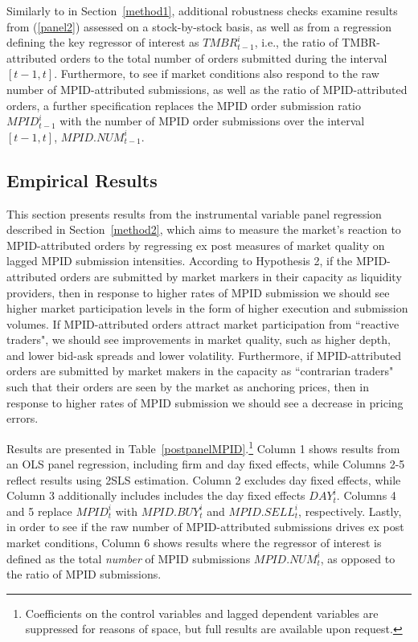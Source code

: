 \documentclass{article}
\begin{document}
Similarly to in Section~\ref{method1}, additional robustness checks examine results from (\ref{panel2}) assessed on a stock-by-stock basis, as well as from a regression defining the key regressor of interest as $TMBR_{t-1}^i$, i.e., the ratio of TMBR-attributed orders to the total number of orders submitted during the interval $[t-1,t]$. Furthermore, to see if market conditions also respond to the raw number of MPID-attributed submissions, as well as the ratio of MPID-attributed orders, a further specification replaces the MPID order submission ratio $MPID_{t-1}^i$ with the number of MPID order submissions over the interval $[t-1,t]$, $MPID.NUM_{t-1}^i$.

\subsection{Empirical Results}

This section presents results from the instrumental variable panel regression described in Section~\ref{method2}, which aims to measure the market's reaction to MPID-attributed orders by regressing ex post measures of market quality on lagged MPID submission intensities. According to Hypothesis 2, if the MPID-attributed orders are submitted by market markers in their capacity as liquidity providers, then in response to higher rates of MPID submission we should see higher market participation levels in the form of higher execution and submission volumes. If MPID-attributed orders attract market participation from ``reactive traders", we should see improvements in market quality, such as higher depth, and lower bid-ask spreads and lower volatility. Furthermore, if MPID-attributed orders are submitted by market makers in the capacity as ``contrarian traders" such that their orders are seen by the market as anchoring prices, then in response to higher rates of MPID submission we should see a decrease in pricing errors.

Results are presented in Table~\ref{postpanelMPID}.\footnote{Coefficients on the control variables and lagged dependent variables are suppressed for reasons of space, but full results are available upon request.} Column 1 shows results from an OLS panel regression, including firm and day fixed effects, while Columns 2-5 reflect results using 2SLS estimation. Column 2 excludes day fixed effects, while Column 3 additionally includes includes the day fixed effects $DAY_t^i$. Columns 4 and 5 replace $MPID_t^i$ with $MPID.BUY_t^i$ and $MPID.SELL_t^i$, respectively. Lastly, in order to see if the raw number of MPID-attributed submissions drives ex post market conditions, Column 6 shows results where the regressor of interest is defined as the total \emph{number} of MPID submissions $MPID.NUM_t^i$, as opposed to the ratio of MPID submissions.
\end{document}

